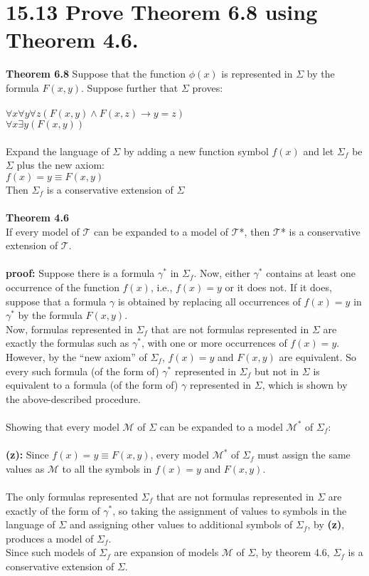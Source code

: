 \documentclass{article}
\begin{document}
\section*{15.13 Prove Theorem 6.8 using Theorem 4.6.}
\textbf{Theorem 6.8} Suppose that the function $\phi (x)$ is represented in $\Sigma$ by the
formula $F(x, y)$. Suppose further that $\Sigma$ proves:\\
\\
$\forall x \forall y \forall z (F(x,y) \wedge F(x,z) \rightarrow y = z)$\\
$\forall x \exists y (F(x,y))$\\
\\
Expand the language of $\Sigma$ by adding a new function symbol $f(x)$ and let $\Sigma_f$ be $\Sigma$ plus the new axiom: \\
$f(x) = y \equiv F(x,y)$\\
Then $\Sigma_f$ is a conservative extension of $\Sigma$
\\
\\
\textbf{Theorem 4.6}\\
If every model of $\mathcal{T}$ can be expanded to a model of $\mathcal{T}$*, then $\mathcal{T}$* is a conservative extension of $\mathcal{T}$.\\
\\\textbf{proof:}
Suppose there is a formula $\gamma^*$ in $\Sigma_f$. Now, either $\gamma^*$ contains at least one occurrence of the function $f(x)$, i.e., $f(x)=y$ or it does not. If it does, suppose that a formula $\gamma$ is obtained by replacing all occurrences of $f(x)=y$ in $\gamma^*$ by the formula $F(x,y)$. \\Now, formulas represented in  $\Sigma_f$ that are not formulas represented in $\Sigma$ are exactly the formulas such as $\gamma^*$, with one or more occurrences of $f(x)=y$.\\However, by the ``new axiom'' of $\Sigma_f$, $f(x)=y$ and $F(x,y)$ are equivalent. So every such formula (of the form of) $\gamma^*$ represented in $\Sigma_f$ but not in $\Sigma$ is equivalent to a formula (of the form of) $\gamma$ represented in $\Sigma$, which is shown by the above-described procedure.\\\\
Showing that every model $\mathcal{M}$ of $\Sigma$ can be expanded to a model $\mathcal{M}^*$ of $\Sigma_f$:\\\\ \textbf{(z):} Since $f(x) = y \equiv F(x,y)$, every model $\mathcal{M}^*$ of $\Sigma_f$ must assign the same values as $\mathcal{M}$ to all the symbols in $f(x)=y$ and $F(x,y)$.\\\\
The only formulas represented $\Sigma_f$ that are not formulas represented in $\Sigma$ are exactly of the form of $\gamma^*$, so taking the assignment of values to symbols in the language of $\Sigma$ and assigning other values to additional symbols of $\Sigma_f$, by \textbf{(z)}, produces a model of $\Sigma_f$.\\ Since such models of $\Sigma_f$ are expansion of models $\mathcal{M}$ of $\Sigma$, by theorem 4.6, $\Sigma_f$ is a conservative extension of $\Sigma$. 
\end{document}
